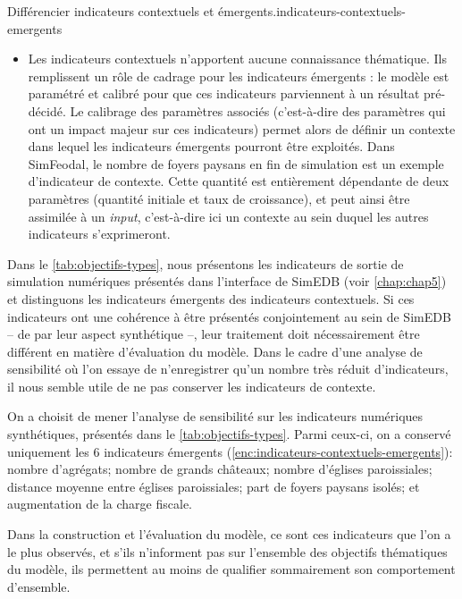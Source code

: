 \begin{encadre}{Différencier indicateurs contextuels et émergents.}{indicateurs-contextuels-emergents}
\begin{itemize}
	\item Les indicateurs contextuels n'apportent aucune connaissance thématique.
	Ils remplissent un rôle de cadrage pour les indicateurs émergents : le modèle est paramétré et calibré pour que ces indicateurs parviennent à un résultat pré-décidé.
	Le calibrage des paramètres associés (c'est-à-dire des paramètres qui ont un impact majeur sur ces indicateurs) permet alors de définir un contexte dans lequel les indicateurs émergents pourront être exploités.
	Dans SimFeodal, le nombre de foyers paysans en fin de simulation est un exemple d'indicateur de contexte.
	Cette quantité est entièrement dépendante de deux paramètres (quantité initiale et taux de croissance), et peut ainsi être assimilée à un \textit{input}, c'est-à-dire ici un contexte au sein duquel les autres indicateurs s'exprimeront.
\end{itemize}

Dans le \cref{tab:objectifs-types}, nous présentons les indicateurs de sortie de simulation numériques présentés dans l'interface de SimEDB (voir \cref{chap:chap5}) et distinguons les indicateurs émergents des indicateurs contextuels.
Si ces indicateurs ont une cohérence à être présentés conjointement au sein de SimEDB -- de par leur aspect synthétique --, leur traitement doit nécessairement être différent en matière d'évaluation du modèle.
Dans le cadre d'une analyse de sensibilité où l'on essaye de n'enregistrer qu'un nombre très réduit d'indicateurs, il nous semble utile de ne pas conserver les indicateurs \og de contexte\fg{}.


\medskip
\end{encadre}

On a choisit de mener l'analyse de sensibilité sur les indicateurs numériques synthétiques, présentés dans le \cref{tab:objectifs-types}.
Parmi ceux-ci, on a conservé uniquement les 6 indicateurs \og émergents\fg{} (\cref{enc:indicateurs-contextuels-emergents}): 
nombre d'agrégats; nombre de grands châteaux; nombre d'églises paroissiales; distance moyenne entre églises paroissiales; part de foyers paysans isolés; et augmentation de la charge fiscale.
	
Dans la construction et l'évaluation du modèle, ce sont ces indicateurs que l'on a le plus observés, et s'ils n'informent pas sur l'ensemble des objectifs thématiques du modèle, ils permettent au moins de qualifier sommairement son comportement d'ensemble.

